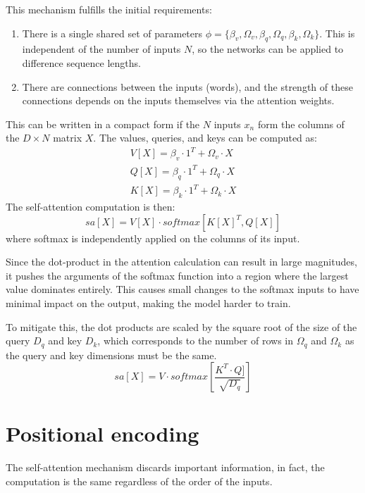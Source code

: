 This mechanism fulfills the initial requirements: 
\begin{enumerate}
    \item There is a single shared set of parameters $\phi = \{\beta_v, \Omega_v, \beta_q, \Omega_q, \beta_k, 
        \Omega_k\}$. This is independent of the number of inputs $N$, so the networks can be applied to difference 
        sequence lengths.
    \item There are connections between the inputs (words), and the strength of these connections depends on the inputs 
        themselves via the attention weights.
\end{enumerate}

This can be written in a compact form if the $N$ inputs $x_n$ form the columns of the $D \times N$ matrix $X$. The 
values, queries, and keys can be computed as:
\begin{align*}
        V[X] = \beta_v \cdot 1^T + \Omega_v \cdot X \\ 
        Q[X] = \beta_q \cdot 1^T + \Omega_q \cdot X \\
        K[X] = \beta_k \cdot 1^T + \Omega_k \cdot X
\end{align*}
The self-attention computation is then: 
\begin{equation}
    sa[X] = V[X] \cdot softmax[K[X]^T, Q[X]]
\end{equation}
where softmax is independently applied on the columns of its input.

Since the dot-product in the attention calculation can result in large magnitudes, it pushes the arguments of the softmax 
function into a region where the largest value dominates entirely. This causes small changes to the softmax inputs to 
have minimal impact on the output, making the model harder to train. 

To mitigate this, the dot products are scaled by the square root of the size of the query $D_q$ and key $D_k$, which 
corresponds to the number of rows in $\Omega_q$ and $\Omega_k$ as the query and key dimensions must be the same.
\begin{equation}
    sa[X] = V \cdot softmax\left[\frac{K^T \cdot Q]}{\sqrt{D_q}}\right]
\end{equation}

\section{Positional encoding}
The self-attention mechanism discards important information, in fact, the computation is the same regardless of the order 
of the inputs. 

